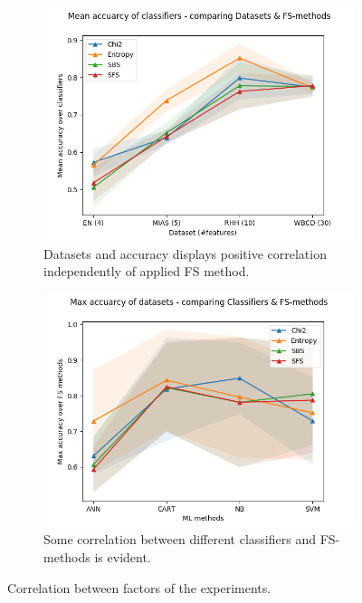 \begin{figure}[ht]
  \centering
    \begin{subfigure}[b]{0.475\textwidth}
        \centering
        \includegraphics[width=\textwidth]{../plots_with_std_fill/comp_acc_datasets.png}
        \caption[]%
        {{\small Datasets and accuracy displays positive correlation independently of applied FS method.}}
        \label{fig:comp_acc_datasets}
    \end{subfigure}
  \hfill
    \begin{subfigure}[b]{0.475\textwidth}
        \centering
        \includegraphics[width=\textwidth]{../plots_with_std_fill/comp_classif_datasets.png}
        \caption[]%
        {{\small Some correlation between different classifiers and FS-methods is evident.}}
        \label{fig:comp_classif_datasets}
    \end{subfigure}
  \caption[]
  {\small Correlation between factors of the experiments.}
  \label{fig:anova_plots}
\end{figure}
